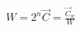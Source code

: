 \documentclass[preview]{standalone}
\begin{document}
\begin{align*}
W = 2^n \vec{C} = \frac{\vec{C}_w}{W}
\end{align*}
\end{document}
